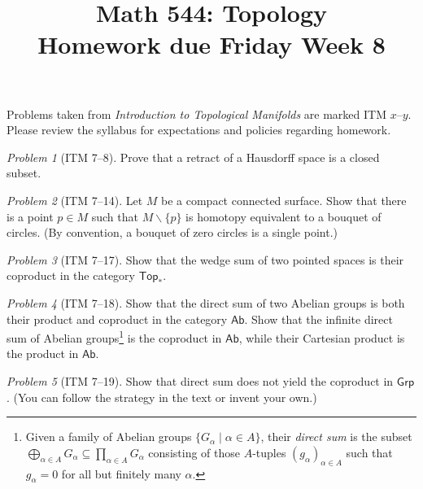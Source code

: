 \documentclass[11pt,twoside]{amsart}
\title{Math 544: Topology\\ Homework due Friday Week 8}
\theoremstyle{plain}
\theoremstyle{remark}
\newtheorem{prob}{Problem}
\theoremstyle{definition}
\theoremstyle{definition}
\newcommand{\Ab}{\mathsf{Ab}}
\newcommand{\Top}{\mathsf{Top}}
\newcommand{\Grp}{\mathsf{Grp}}
\begin{document}
\maketitle

\noindent Problems taken from \emph{Introduction to Topological Manifolds} are marked ITM $x$--$y$. Please review the syllabus for expectations and policies regarding homework.

\begin{prob}[ITM 7--8]
Prove that a retract of a Hausdorff space is a closed subset.
\end{prob}

\begin{prob}[ITM 7--14]
Let $M$ be a compact connected surface. Show that there is a point $p\in M$ such that $M\smallsetminus \{p\}$ is homotopy equivalent to a bouquet of circles. (By convention, a bouquet of zero circles is a single point.)
\end{prob}

\begin{prob}[ITM 7--17]
Show that the wedge sum of two pointed spaces is their coproduct in the category $\Top_*$.
\end{prob}

\begin{prob}[ITM 7--18]
Show that the direct sum of two Abelian groups is both their product and coproduct in the category $\Ab$. Show that the infinite direct sum of Abelian groups\footnote{Given a family of Abelian groups $\{G_\alpha\mid \alpha\in A\}$, their \emph{direct sum} is the subset $\bigoplus_{\alpha\in A}G_\alpha\subseteq \prod_{\alpha\in A}G_\alpha$ consisting of those $A$-tuples $(g_\alpha)_{\alpha\in A}$ such that $g_\alpha=0$ for all but finitely many $\alpha$.} is the coproduct in $\Ab$, while their Cartesian product is the product in $\Ab$.
\end{prob}

\begin{prob}[ITM 7--19]
Show that direct sum does not yield the coproduct in $\Grp$. (You can follow the strategy in the text or invent your own.)
\end{prob}
\end{document}
